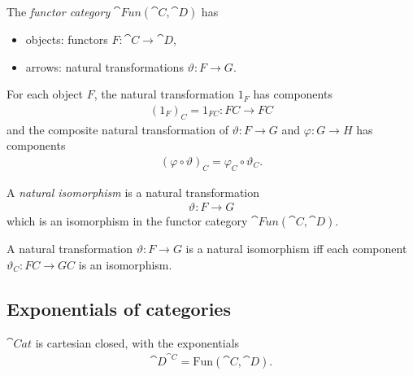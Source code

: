\documentclass{article}
\begin{document}
\begin{definition}[Awodey p. 158]
	The \emph{functor category} $\cat{Fun}(\cat C, \cat D)$ has
	\begin{itemize}
		\item objects: functors $F:\cat C \to \cat D$,
		\item arrows: natural transformations $\vartheta:F\to G$.
	\end{itemize}
	For each object $F$, the natural transformation $1_F$ has components
	\begin{align*}
		(1_F)_C = 1_{FC}:FC\to FC
	\end{align*}
	and the composite natural transformation of $\vartheta:F\to G$ and
	$\varphi:G\to H$ has components
	\begin{align*}
		(\varphi\circ\vartheta)_C=\varphi_C\circ\vartheta_C.
	\end{align*}
\end{definition}

\begin{definition}[Awodey p. 158]
	A \emph{natural isomorphism} is a natural transformation
	\begin{align*}
		\vartheta: F\to G
	\end{align*}
	which is an isomorphism in the functor category $\cat{Fun}(\cat C, \cat D)$.
\end{definition}

\begin{lemma}[Awodey p. 159]
	A natural transformation $\vartheta:F\to G$ is a natural isomorphism
	iff each component $\vartheta_C:FC\to GC$ is an isomorphism.
\end{lemma}

\subsection{Exponentials of categories}

\begin{proposition}[Awodey p. 161]
	$\cat{Cat}$ is cartesian closed, with the exponentials
	\begin{align*}
		\cat D^{\cat C} = \text{Fun}(\cat C, \cat D).
	\end{align*}
\end{proposition}
\end{document}
